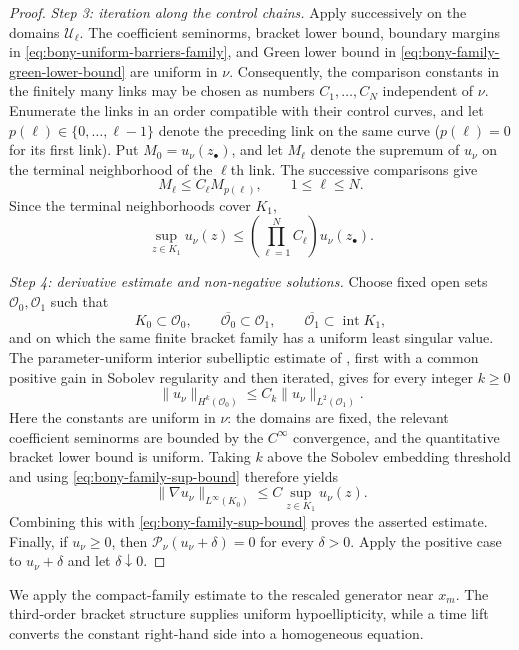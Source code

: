 \documentclass[11pt]{article}
\numberwithin{equation}{section}
\theoremstyle{plain}
\theoremstyle{definition}
\theoremstyle{remark}
\begin{document}
\begin{proof}
\emph{Step 3: iteration along the control chains.}
Apply \cite[Proposition~7.1]{Bony1969} successively on the domains
$\mathscr U_\ell$.  The coefficient seminorms, bracket lower bound,
boundary margins in \eqref{eq:bony-uniform-barriers-family}, and Green lower
bound in \eqref{eq:bony-family-green-lower-bound} are uniform in $\nu$.
Consequently, the comparison constants in the finitely many links may be
chosen as numbers $C_1,\ldots,C_N$ independent of $\nu$.  Enumerate the links
in an order compatible with their control curves, and let
$p(\ell)\in\{0,\ldots,\ell-1\}$ denote the preceding link on the same curve
($p(\ell)=0$ for its first link).  Put $M_0=u_\nu(z_\bullet)$, and let
$M_\ell$ denote the supremum of $u_\nu$ on the terminal neighborhood of the
$\ell$th link.  The successive comparisons give
\[
M_\ell\le C_\ell M_{p(\ell)},
\qquad 1\le\ell\le N.
\]
Since the terminal neighborhoods cover $K_1$,
\begin{equation}
\label{eq:bony-family-sup-bound}
\sup_{z\in K_1}u_\nu(z)
\le\left(\prod_{\ell=1}^NC_\ell\right)u_\nu(z_\bullet).
\end{equation}

\emph{Step 4: derivative estimate and non-negative solutions.}
Choose fixed open sets $\mathcal O_0,\mathcal O_1$ such that
\[
K_0\subset\mathcal O_0,\qquad
\overline{\mathcal O_0}\subset\mathcal O_1,\qquad
\overline{\mathcal O_1}\subset\operatorname{int}K_1,
\]
and on which the same finite bracket family has a uniform least singular
value.  The parameter-uniform interior subelliptic
estimate of \cite{RothschildStein1976}, first with a common positive gain in
Sobolev regularity and then iterated, gives for every integer $k\ge0$
\[
\|u_\nu\|_{H^k(\mathcal O_0)}
\le C_k\|u_\nu\|_{L^2(\mathcal O_1)}.
\]
Here the constants are uniform in $\nu$: the domains are fixed, the relevant
coefficient seminorms are bounded by the $C^\infty$ convergence, and the
quantitative bracket lower bound is uniform.  Taking $k$ above the Sobolev
embedding threshold and using
\eqref{eq:bony-family-sup-bound} therefore yields
\[
\|\nabla u_\nu\|_{L^\infty(K_0)}
\le C\sup_{z\in K_1}u_\nu(z).
\]
Combining this with \eqref{eq:bony-family-sup-bound} proves the asserted
estimate.  Finally, if $u_\nu\ge0$, then
$\mathscr P_\nu(u_\nu+\delta)=0$ for every $\delta>0$.  Apply the positive
case to $u_\nu+\delta$ and let $\delta\downarrow0$.
\end{proof}

We apply the compact-family estimate to the rescaled generator
near $x_m$.  The third-order bracket structure supplies uniform
hypoellipticity, while a time lift converts the constant right-hand side into
a homogeneous equation.
\end{document}
